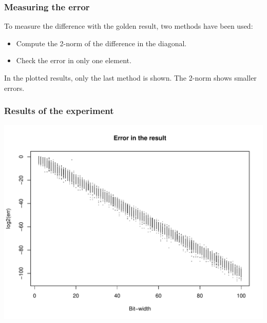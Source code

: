 \documentclass[serif, 12pt]{beamer}
\begin{document}

\begin{frame}
\frametitle{Measuring the error}

To measure the difference with the golden result, two methods have been used:

\begin{itemize}
\item Compute the 2-norm of the difference in the diagonal.
\item Check the error in only one element.
\end{itemize}

In the plotted results, only the last method is shown. The 2-norm shows smaller 
errors.

\end{frame}


\begin{frame}
\frametitle{Results of the experiment}

\begin{adjustwidth}{-2em}{-2em}
\centering
\includegraphics[scale=0.55]{../../src/err.pdf}
\end{adjustwidth}

\end{frame}

\end{document}
